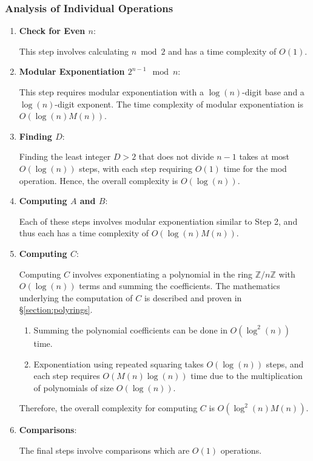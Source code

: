 \documentclass{article}
\theoremstyle{plain}
\theoremstyle{definition}
\begin{document}
\subsubsection{Analysis of Individual Operations}
\begin{enumerate}
    \item \textbf{Check for Even \( n \)}:
    
        This step involves calculating $n \bmod{2}$ and has a time complexity of \( O(1) \).

    \item \textbf{Modular Exponentiation \( 2^{n-1} \mod n \)}:
    
        This step requires modular exponentiation with a \( \log(n) \)-digit base and a \( \log(n) \)-digit exponent. The time complexity of modular exponentiation is \( O(\log(n) M(n)) \).

    \item \textbf{Finding \( D \)}:
    
        Finding the least integer \( D > 2 \) that does not divide \( n-1 \) takes at most \( O(\log(n)) \) steps, with each step requiring \( O(1) \) time for the mod operation. Hence, the overall complexity is \( O(\log(n)) \).

    \item \textbf{Computing \( A \) and \( B \)}:
    
        Each of these steps involves modular exponentiation similar to Step 2, and thus each has a time complexity of \( O(\log(n) M(n)) \).

    \item \textbf{Computing \( C \)}:
    
        Computing \( C \) involves exponentiating a polynomial in the ring \(\mathbb{Z}/n\mathbb{Z}\) with \( O(\log(n)) \) terms and summing the coefficients. The mathematics underlying the computation of \( C \) is described and proven in \S \ref{section:polyrings}.
        \begin{enumerate}
            \item Summing the polynomial coefficients can be done in \( O(\log^2(n)) \) time.
            \item Exponentiation using repeated squaring takes \( O(\log(n)) \) steps, and each step requires \( O(M(n)\log(n)) \) time due to the multiplication of polynomials of size \( O(\log(n)) \).
        \end{enumerate}
         Therefore, the overall complexity for computing \( C \) is \( O(\log^2(n) M(n)) \).
         
    \item \textbf{Comparisons}:
    
        The final steps involve comparisons which are \( O(1) \) operations.
\end{enumerate}
\end{document}
